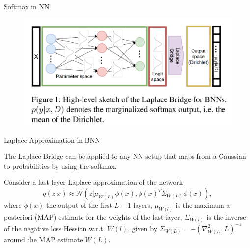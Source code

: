 \documentclass{beamer}
\begin{document}
\begin{frame}{Softmax in NN}
    \begin{figure}
        \centering
        \includegraphics[width=1.0\textwidth]{figs/softmax.png} %
    \end{figure}
\end{frame}


\begin{frame}{Laplace Approximation in BNN}

The Laplace Bridge can be applied to any NN setup that
maps from a Gaussian to probabilities by using the softmax.

Consider a last-layer Laplace approximation of the network \begin{equation}
    q(z|x) \approx \mathcal{N} \left(z \big| \mu_{W(L)} \phi(x), \phi(x)^T \Sigma_{W(L)} \phi(x) \right), \tag{8}
\end{equation}
where $\phi(x)$ the output of the first $L - 1$ layers, $\mu_{W(l)}$ is the maximum a posteriori (MAP) estimate for the weights of the last layer, $\Sigma_{ W(l)}$ is the inverse of the negative loss Hessian w.r.t. $W(l)$, given by $\Sigma_{W(L)} = -(\nabla^2_{W(L)} L)^{-1}$
around the MAP estimate $W(L)$. 

\end{frame}
\end{document}
